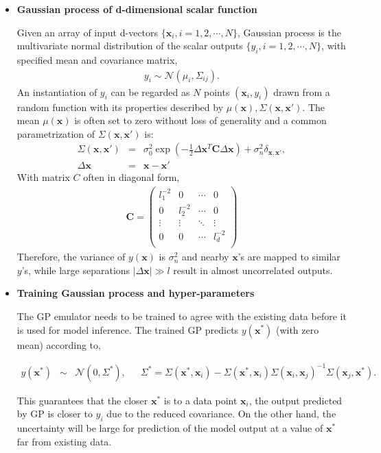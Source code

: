 \documentclass[aps,prl,twocolumn,groupedaddress]{revtex4-1}
\begin{document}
	 \begin{itemize}
	 \item {\bf Gaussian process of d-dimensional scalar function}
	 
	 Given an array of input d-vectors $\{\mathbf{x}_i, i = 1, 2, \cdots, N\}$, Gaussian process is the multivariate normal distribution of the scalar outputs $\{y_i, i = 1, 2, \cdots, N\}$,  with specified mean and covariance matrix,
	 \begin{eqnarray}
	 y_i \sim \mathcal{N}(\mu_i, \Sigma_{ij}).
	 \end{eqnarray}
An instantiation of $y_i$ can be regarded as $N$ points $(\mathbf{x}_i, y_i)$ drawn from a random function with its properties described by $\mu(\mathbf{x}), \Sigma(\mathbf{x}, \mathbf{x}')$.  
	The mean $\mu(\mathbf{x})$ is often set to zero without loss of generality and a common parametrization of $\Sigma(\mathbf{x}, \mathbf{x}')$ is:
	\begin{eqnarray}\label{kernel}
		\Sigma(\mathbf{x}, \mathbf{x}') &=& \sigma_0^2\exp\left( -\frac{1}{2}\Delta\mathbf{x}^T \mathbf{C} \Delta\mathbf{x} \right) + \sigma_n^2\delta_{\mathbf{x}, \mathbf{x}'}, \\
		\Delta\mathbf{x} &=& \mathbf{x} - \mathbf{x}'	
	\end{eqnarray}
	With  matrix $C$ often in diagonal form,
	\begin{eqnarray}
		\mathbf{C} = 
		\left(		
		\begin{array}{cccc}
			l_1^{-2} 	& 	0 		&	 \cdots & 0	\\
			0 			& l_2^{-2}	 & 		\cdots & 0	\\
			\vdots 			& \vdots & \ddots & \vdots	\\
			0 			& 		0 & \cdots & l_d^{-2} \\
		\end{array}
		\right)
	\end{eqnarray}
	Therefore, the variance of $y(\mathbf{x})$ is $\sigma_n^2$ and nearby $\mathbf{x}$'s are mapped to similar $y$'s, while large separations $| \Delta \mathbf{x} | \gg l$ result in almost uncorrelated outputs.
	 
	 
	 \item {\bf Training Gaussian process and hyper-parameters}
	 
	 The GP emulator needs to be trained to agree with the existing data before it is used for model inference.
	 The trained GP predicts $y(\mathbf{x}^*)$ (with zero mean) according to,\begin{widetext}
	 \begin{eqnarray}
	 	y(\mathbf{x}^*) &\sim& \mathcal{N}\left(0, \Sigma^*\right), 
	 	\phantom{123}
	 	\Sigma^* = \Sigma(\mathbf{x}^*, \mathbf{x}_i) -  \Sigma(\mathbf{x}^*, \mathbf{x}_i) \Sigma(\mathbf{x}_i, \mathbf{x}_j)^{-1} \Sigma(\mathbf{x}_j, \mathbf{x}^*).
	 \end{eqnarray}
\end{widetext}
	 This guarantees that the closer $\mathbf{x}^*$ is to a data point $\mathbf{x}_i$, the output predicted by GP is closer to $y_i$ due to the reduced covariance. 
	 On the other hand, the uncertainty will be large for prediction of the model output at a value of $\mathbf{x}^*$ far from existing data.


\end{itemize}
\end{document}
